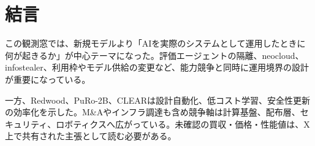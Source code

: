 \section{結言}
この観測窓では、新規モデルより「AIを実際のシステムとして運用したときに何が起きるか」が中心テーマになった。評価エージェントの隔離、neocloud、infostealer、利用枠やモデル供給の変更など、能力競争と同時に運用境界の設計が重要になっている。

一方、Redwood、PuRo-2B、CLEARは設計自動化、低コスト学習、安全性更新の効率化を示した。M\&Aやインフラ調達も含め競争軸は計算基盤、配布層、セキュリティ、ロボティクスへ広がっている。未確認の買収・価格・性能値は、X上で共有された主張として読む必要がある。

